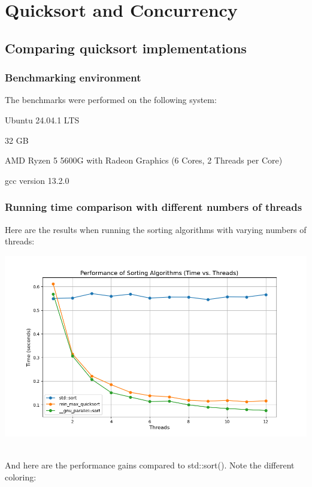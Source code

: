 \documentclass[../../main.tex]{subfiles}
\begin{document}
\section{Quicksort and Concurrency}
\subsection{Comparing quicksort implementations}
\subsubsection{Benchmarking environment}
The benchmarks were performed on the following system:

\begin{description}[style=nextline, labelwidth=4.8cm, labelindent=0cm, leftmargin=5cm, font=\normalfont\bfseries]
    \item[Operating System:] Ubuntu 24.04.1 LTS
    \item[RAM:] 32 GB
    \item[CPU:] AMD Ryzen 5 5600G with Radeon Graphics (6 Cores, 2 Threads per Core)
    \item[Compiler:] gcc version 13.2.0
\end{description}


\newpage
\subsubsection{Running time comparison with different numbers of threads}
Here are the results when running the sorting algorithms with varying numbers of threads:

\includegraphics[width=\linewidth]{./running_times.png}

~\\
And here are the performance gains compared to std::sort(). Note the different coloring:
\end{document}
